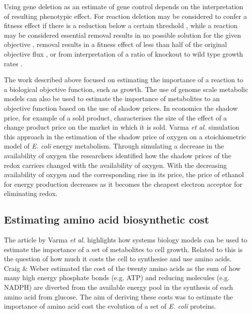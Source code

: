 Using gene deletion as an estimate of gene control depends on the interpretation of resulting phenotypic effect. For reaction deletion may be considered to confer a fitness effect if there is a reduction below a certain threshold \cite{pal2006}, while a reaction may be considered essential removal results in no possible solution for the given objective \cite{becker2008}, removal results in a fitness effect of less than half of the original objective flux \cite{papp2004}, or from interpretation of a ratio of knockout to wild type growth rates \cite{wang2009}.

The work described above focused on estimating the importance of a reaction to a biological objective function, such as growth. The use of genome scale metabolic models can also be used to estimate the importance of metabolites to an objective function based on the use of shadow prices. In economics the shadow price, for example of a sold product, characterises the size of the  effect of a change product price on the market in which it is sold. Varma \emph{et al.} \cite{varma1993} simulation this approach in the estimation of the shadow price of oxygen on a stoichiometric model of \emph{E. coli} energy metabolism. Through simulating a decrease in the availability of oxygen the researchers identified how the shadow prices of the redox carriers changed with the availability of oxygen. With the decreasing availability of oxygen and the corresponding rise in its price, the price of ethanol for energy production decreases as it becomes the cheapest electron acceptor for eliminating redox.

\subsection{Estimating amino acid biosynthetic cost}

The article by Varma \emph{et al.} highlights how systems biology models can be used to estimate the importance of a set of metabolites to cell growth. Related to this is the question of how much it costs the cell to synthesise and use amino acids. Craig \& Weber \cite{craig1998} estimated the cost of the twenty amino acids as the sum of how many high energy phosphate bonds (e.g. ATP) and reducing molecules (e.g. NADPH) are diverted from the available energy pool in the synthesis of each amino acid from glucose. The aim of deriving these costs was to estimate the importance of amino acid cost the evolution of a set of \emph{E. coli} proteins.

